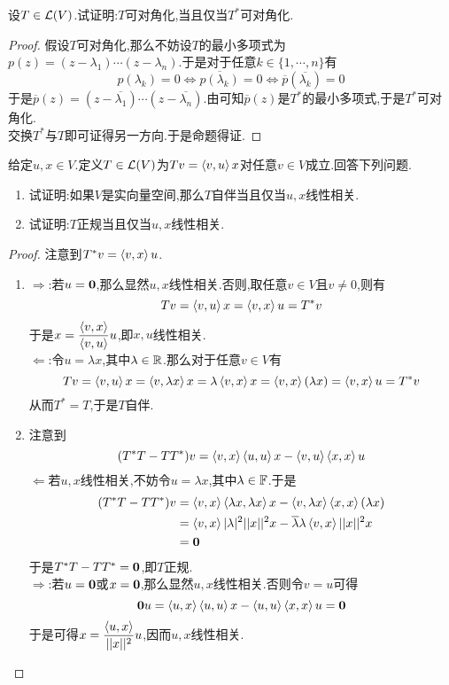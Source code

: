 \documentclass{ctexart}
\begin{document}
\begin{problem}[25.]
    设$T\in\mathcal{L}(V)$.试证明:$T$可对角化,当且仅当$T^*$可对角化.
\end{problem}
\begin{proof}
    假设$T$可对角化,那么不妨设$T$的最小多项式为$p(z)=(z-\lambda_1)\cdots(z-\lambda_n)$.于是对于任意$k\in\{1,\cdots,n\}$有
    \[p(\lambda_k)=0\Leftrightarrow\overline{p(\lambda_k)}=0\Leftrightarrow\overline{p}(\overline{\lambda_k})=0\]
    于是$\overline{p}(z)=(z-\overline{\lambda_1})\cdots(z-\overline{\lambda_n})$.由可知$\overline{p}(z)$是$T^*$的最小多项式,于是$T^*$可对角化.\\
    交换$T^*$与$T$即可证得另一方向.于是命题得证.
\end{proof}
\begin{problem}[26.]
    给定$u,x\in V$.定义$T\in\mathcal{L}(V)$为$Tv=\left\langle{v},{u}\right\rangle x$对任意$v\in V$成立.回答下列问题.
    \begin{enumerate}[label=\tbf{(\arabic*)}]
        \item 试证明:如果$V$是实向量空间,那么$T$自伴当且仅当$u,x$线性相关.
        \item 试证明:$T$正规当且仅当$u,x$线性相关.
    \end{enumerate}
\end{problem}
\begin{proof}
    注意到$T^*v=\left\langle{v},{x}\right\rangle u$.
    \begin{enumerate}[label=\tbf{(\arabic*)}]
        \item $\Rightarrow$:若$u=\mathbf0$,那么显然$u,x$线性相关.否则,取任意$v\in V$且$v\neq0$,则有
            \[Tv=\left\langle{v},{u}\right\rangle x=\left\langle{v},{x}\right\rangle u=T^*v\]
            于是$x=\dfrac{\left\langle{v},{x}\right\rangle}{\left\langle{v},{u}\right\rangle}u$,即$x,u$线性相关.\\
            $\Leftarrow$:令$u=\lambda x$,其中$\lambda\in\mathbb{R}$.那么对于任意$v\in V$有
            \[Tv=\left\langle{v},{u}\right\rangle x=\left\langle{v},{\lambda x}\right\rangle x=\lambda\left\langle{v},{x}\right\rangle x=\left\langle{v},{x}\right\rangle(\lambda x)=\left\langle{v},{x}\right\rangle u=T^*v\]
            从而$T^*=T$,于是$T$自伴.
        \item 注意到
            \[(T^*T-TT^*)v=\left\langle{v},{x}\right\rangle\left\langle{u},{u}\right\rangle x-\left\langle{v},{u}\right\rangle\left\langle{x},{x}\right\rangle u\]
            $\Leftarrow$若$u,x$线性相关,不妨令$u=\lambda x$,其中$\lambda\in\mathbb{F}$.于是
            \[\begin{aligned}
                (T^*T-TT^*)v
                &= \left\langle{v},{x}\right\rangle\left\langle{\lambda x},{\lambda x}\right\rangle x-\left\langle{v},{\lambda x}\right\rangle\left\langle{x},{x}\right\rangle(\lambda x) \\
                &= \left\langle{v},{x}\right\rangle|\lambda|^2||x||^2x-\overline{\lambda}\lambda\left\langle{v},{x}\right\rangle||x||^2x \\
                &= \mathbf0
            \end{aligned}\]
            于是$T^*T-TT^*=\mathbf0$,即$T$正规.\\
            $\Rightarrow$:若$u=\mathbf0$或$x=\mathbf0$,那么显然$u,x$线性相关.否则令$v=u$可得
            \[\mathbf0u=\left\langle{u},{x}\right\rangle\left\langle{u},{u}\right\rangle x-\left\langle{u},{u}\right\rangle\left\langle{x},{x}\right\rangle u=\mathbf0\]
            于是可得$x=\dfrac{\left\langle{u},{x}\right\rangle}{||x||^2}u$,因而$u,x$线性相关.
    \end{enumerate}
\end{proof}
\end{document}

